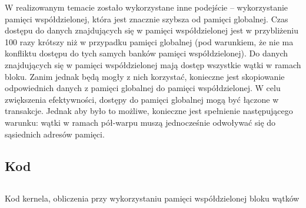 \documentclass[12pt,a4paper]{article}
\begin{document}
W realizowanym temacie zostało wykorzystane inne podejście -- wykorzystanie pamięci współdzielonej, która jest znacznie szybsza od pamięci globalnej. Czas dostępu do danych znajdujących się w pamięci współdzielonej jest w przybliżeniu 100 razy krótszy niż w przypadku pamięci globalnej (pod warunkiem, że nie ma konfliktu dostępu do tych samych banków pamięci współdzielonej). Do danych znajdujących się w pamięci współdzielonej mają dostęp wszystkie wątki w ramach bloku. Zanim jednak będą mogły z nich korzystać, konieczne jest skopiowanie odpowiednich danych z pamięci globalnej do pamięci współdzielonej. W celu zwiększenia efektywności, dostępy do pamięci globalnej mogą być łączone w transakcje. Jednak aby było to możliwe, konieczne jest spełnienie następującego warunku: wątki w ramach pół-warpu muszą jednocześnie odwoływać się do sąsiednich adresów pamięci.


\subsection{Kod}


\begin{listing}[H]
\inputminted{cuda}{listings/kernel.cu}
\caption{Kod kernela, obliczenia przy wykorzystaniu pamięci współdzielonej bloku wątków}
\label{lst:kernel}
\end{listing}
\end{document}
